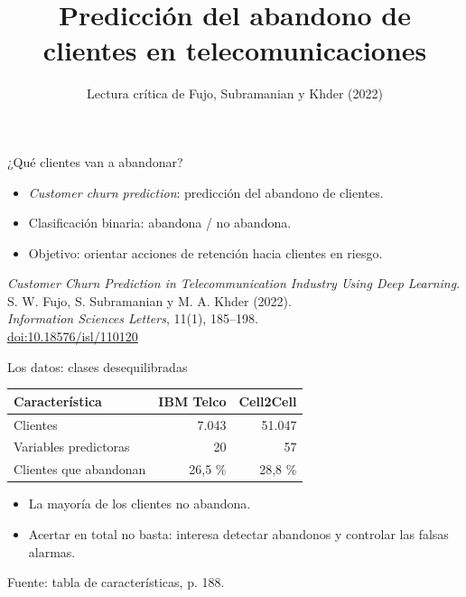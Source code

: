 \documentclass[aspectratio=169,11pt]{beamer}
\date{}
\title{Predicción del abandono de clientes en telecomunicaciones}
\subtitle{Lectura crítica de Fujo, Subramanian y Khder (2022)}
\begin{document}
\begin{frame}[label={sec:org4c7d978}]{¿Qué clientes van a abandonar?}
\begin{itemize}
\item \emph{Customer churn prediction}: predicción del abandono de clientes.
\item Clasificación binaria: \alert{abandona / no abandona}.
\item Objetivo: orientar acciones de retención hacia clientes en riesgo.
\end{itemize}

\vfill
\footnotesize
\textit{Customer Churn Prediction in Telecommunication Industry Using Deep Learning}.\\
S. W. Fujo, S. Subramanian y M. A. Khder (2022).\\
\textit{Information Sciences Letters}, 11(1), 185--198.\\
\href{https://doi.org/10.18576/isl/110120}{doi:10.18576/isl/110120}
\end{frame}
\begin{frame}[label={sec:orgdbaab05}]{Los datos: clases desequilibradas}
\begin{center}
\begin{tabular}{lrr}
\toprule
Característica & IBM Telco & Cell2Cell\\
\midrule
Clientes & 7.043 & 51.047\\
Variables predictoras & 20 & 57\\
Clientes que abandonan & 26,5 \% & 28,8 \%\\
\bottomrule
\end{tabular}
\end{center}

\begin{itemize}
\item La mayoría de los clientes \alert{no abandona}.
\item Acertar en total no basta: interesa \alert{detectar abandonos} y controlar las \alert{falsas alarmas}.
\end{itemize}

\vfill
\footnotesize Fuente: tabla de características, p. 188.
\end{frame}
\end{document}
